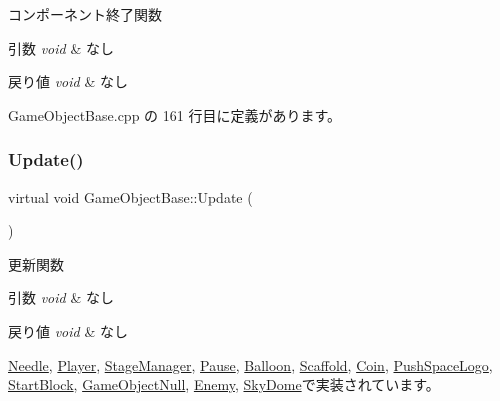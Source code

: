 コンポーネント終了関数 


\begin{DoxyParams}{引数}
{\em void} & なし \\
\hline
\end{DoxyParams}

\begin{DoxyRetVals}{戻り値}
{\em void} & なし \\
\hline
\end{DoxyRetVals}


 Game\+Object\+Base.\+cpp の 161 行目に定義があります。

\mbox{\label{class_game_object_base_a287df113928cd40630fbb1e47a935831}} 
\subsubsection{\texorpdfstring{Update()}{Update()}}
{\footnotesize\ttfamily virtual void Game\+Object\+Base\+::\+Update (\begin{DoxyParamCaption}{ }\end{DoxyParamCaption})\hspace{0.3cm}{\ttfamily [pure virtual]}}



更新関数 


\begin{DoxyParams}{引数}
{\em void} & なし \\
\hline
\end{DoxyParams}

\begin{DoxyRetVals}{戻り値}
{\em void} & なし \\
\hline
\end{DoxyRetVals}


\mbox{\hyperlink{class_needle_adf4790c9ad674b809ae576a09a3ee2f2}{Needle}}, \mbox{\hyperlink{class_player_a5e17be3418fa0ac0192c05efaf3dc8bd}{Player}}, \mbox{\hyperlink{class_stage_manager_a254173b565937107fdfe02c0871b3520}{Stage\+Manager}}, \mbox{\hyperlink{class_pause_aeb1d068bcff8e32feea81945e2202141}{Pause}}, \mbox{\hyperlink{class_balloon_ac924b8fb0e2ba4a2a3bae0b7fed6ad13}{Balloon}}, \mbox{\hyperlink{class_scaffold_a0799d380645a9d4e92dfd90f6bb6f9e9}{Scaffold}}, \mbox{\hyperlink{class_coin_a6969409d8c97fc0f51dfe10d5b5072c6}{Coin}}, \mbox{\hyperlink{class_push_space_logo_a2f81cf35e02096bf309146c0bce0b44d}{Push\+Space\+Logo}}, \mbox{\hyperlink{class_start_block_a89fb4c5fafc1d94155c09ba9b22bb94d}{Start\+Block}}, \mbox{\hyperlink{class_game_object_null_aeeb51b7e7aa41fd0b16f8f7c016bdb55}{Game\+Object\+Null}}, \mbox{\hyperlink{class_enemy_a614ad271f07ecf63cb3e665155b7e258}{Enemy}}, \mbox{\hyperlink{class_sky_dome_ad9b9bfc252cbdc373dfca964430bdb89}{Sky\+Dome}}で実装されています。




